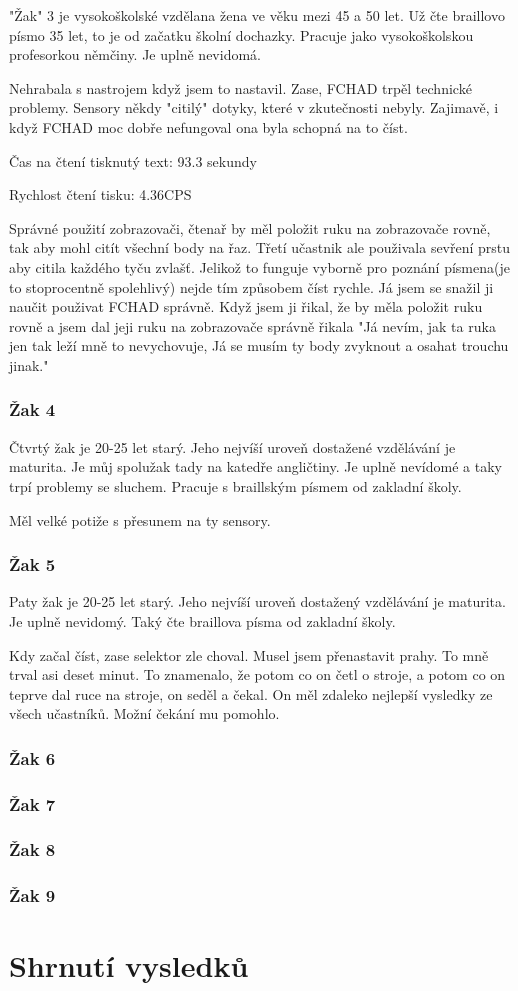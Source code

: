 "Žak" 3 je vysokoškolské vzdělana žena ve věku mezi 45 a 50 let. Už čte braillovo písmo 35 let, to je od začatku školní dochazky.  Pracuje jako vysokoškolskou profesorkou němčiny.  Je uplně nevidomá.

Nehrabala s nastrojem když jsem to nastavil. Zase, FCHAD trpěl technické problemy. Sensory někdy "citilý" dotyky, které v zkutečnosti nebyly.  Zajimavě, i když FCHAD moc dobře nefungoval ona byla schopná na to číst.

Čas na čtení tisknutý text: 93.3 sekundy

Rychlost čtení tisku: 4.36CPS

Správné použití zobrazovači, čtenař by měl položit ruku na zobrazovače rovně, tak aby mohl citít všechní body na řaz.  Třetí učastnik ale použivala sevření prstu aby citila každého tyču zvlašť.  Jelikož to funguje vyborně pro poznání písmena(je to stoprocentně spolehlivý) nejde tím způsobem číst rychle. Já jsem se snažil ji naučit použivat FCHAD správně.  Když jsem ji řikal, že by měla položit ruku rovně a jsem dal jeji ruku na zobrazovače správně řikala "Já nevím, jak ta ruka jen tak leží mně to nevychovuje, Já se musím ty body zvyknout a osahat trouchu jinak." %


\subsubsection{Žak 4}

Čtvrtý žak je 20-25 let starý.  Jeho nejvíší uroveň dostažené vzdělávání je maturita.  Je můj spolužak tady na katedře angličtiny. Je uplně nevídomé a taky trpí problemy se sluchem.  Pracuje s braillským písmem od zakladní školy.

Měl velké potiže s přesunem na ty sensory.

\subsubsection{Žak 5}

Paty žak je 20-25 let starý.  Jeho nejvíší uroveň dostažený vzdělávání je maturita. Je uplně nevidomý.  Taký čte braillova písma od zakladní školy.

Kdy začal číst, zase selektor zle choval.  Musel jsem přenastavit prahy.  To mně trval asi deset minut.  To znamenalo, že potom co on četl o stroje, a potom co on teprve dal ruce na stroje, on seděl a čekal.  On měl zdaleko nejlepší vysledky ze všech učastníků.  Možní čekání mu pomohlo.

\subsubsection{Žak 6}

\subsubsection{Žak 7}

\subsubsection{Žak 8}

\subsubsection{Žak 9}

\section{Shrnutí vysledků}
